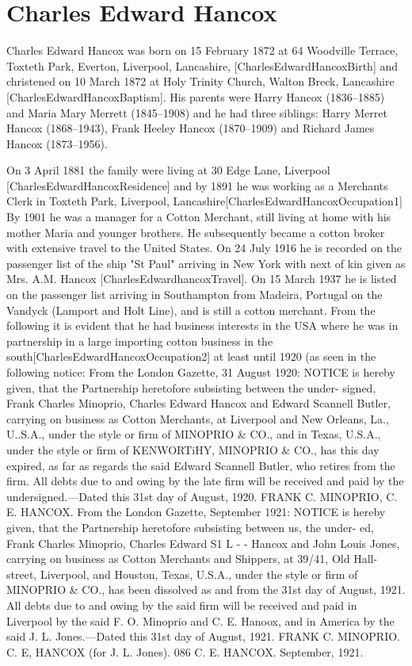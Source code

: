 \section{Charles Edward Hancox}\label{Charles_Edward_Hancox}

Charles Edward Hancox was born on 15 February 1872 at 64 Woodville Terrace, Toxteth Park, Everton, Liverpool, Lancashire, [CharlesEdwardHancoxBirth] and christened on 10 March 1872 at Holy Trinity Church, Walton Breck, Lancashire [CharlesEdwardHancoxBaptism]. His parents were Harry Hancox (1836--1885) and Maria Mary Merrett (1845--1908) and he had three siblings: Harry Merret Hancox (1868--1943), Frank Heeley Hancox (1870--1909) and Richard James Hancox (1873--1956).


On 3 April 1881 the family were living at 30 Edge Lane, Liverpool [CharlesEdwardHancoxResidence] and by 1891 he was working as a Merchants Clerk in Toxteth Park, Liverpool, Lancashire[CharlesEdwardHancoxOccupation1]
By 1901 he was a manager for a Cotton Merchant, still living at home with his mother Maria and younger brothers. He subsequently became a cotton broker with extensive travel to the United States.  On 24 July 1916 he is recorded on the passenger list of the ship "St Paul" arriving in New York with next of kin given as Mrs. A.M. Hancox [CharlesEdwardhancoxTravel]. On 15 March 1937 he is listed on the passenger list arriving in Southampton from Madeira, Portugal on the Vandyck (Lamport and Holt Line), and is still a cotton merchant. From the following it is evident that he had business interests in the USA where he was in partnership in a large importing cotton business in the south[CharlesEdwardHancoxOccupation2] at least until 1920 (as seen in the following notice:
From the London Gazette, 31 August 1920: NOTICE is hereby given, that the Partnership heretofore subsisting between the under- signed, Frank Charles Minoprio, Charles Edward Hancox and Edward Scannell Butler, carrying on business as Cotton Merchants, at Liverpool and New Orleans, La., U..S.A., under the style or firm of MINOPRIO \& CO., and in Texas, U.S.A., under the style or firm of KENWORTiHY, MINOPRIO \& CO., has this day expired, as far as regards the said Edward Scannell Butler, who retires from the firm. All debts due to and owing by the late firm will be received and paid by the undersigned.—Dated this 31st day of August, 1920. FRANK C. MINOPRIO, C. E. HANCOX. From the London Gazette, September 1921: NOTICE is hereby given, that the Partnership heretofore subsisting between us, the under- ed, Frank Charles Minoprio, Charles Edward S1 L - - Hancox and John Louis Jones, carrying on business as Cotton Merchants and Shippers, at 39/41, Old Hall-street, Liverpool, and Houston, Texas, U.S.A., under the style or firm of MINOPRIO \& CO., has been dissolved as and from the 31st day of August, 1921. All debts due to and owing by the said firm will be received and paid in Liverpool by the said F. O. Minoprio and C. E. Hanoox, and in America by the said J. L. Jones.—Dated this 31st day of August, 1921. FRANK C. MINOPRIO. C. E, HANCOX (for J. L. Jones). 086 C. E. HANCOX. September, 1921.

